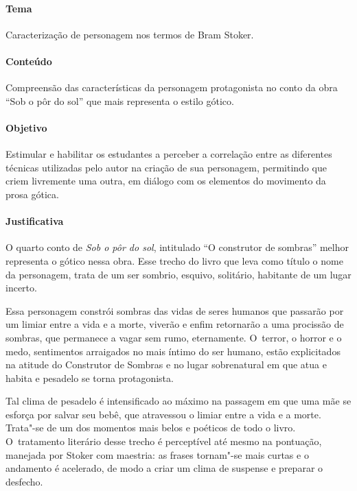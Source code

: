 \documentclass[12pt]{extarticle}
\begin{document}
\paragraph{Tema} Caracterização de personagem nos termos de Bram Stoker.

\paragraph{Conteúdo} Compreensão das características da personagem protagonista 
no conto da obra ``Sob o pôr do sol'' que mais representa o estilo gótico.  

\paragraph{Objetivo} Estimular e habilitar os estudantes a perceber a 
correlação entre as diferentes técnicas utilizadas pelo autor na criação de sua 
personagem, permitindo que criem livremente uma outra, em diálogo com os elementos 
do movimento da prosa gótica. 

\paragraph{Justificativa} O quarto conto de \textit{Sob o pôr do sol}, intitulado 
``O construtor de sombras'' melhor representa o gótico nessa obra. Esse trecho do livro 
que leva como título o nome da personagem, trata de um ser sombrio, esquivo, solitário, 
habitante de um lugar incerto. 

Essa personagem constrói sombras das vidas de seres humanos que passarão por um limiar entre 
a vida e  a morte, viverão e enfim retornarão a uma procissão de sombras, que permanece a 
vagar sem rumo, eternamente. O~terror, o horror e o medo, sentimentos arraigados
no mais íntimo do ser humano, estão explicitados na atitude do
Construtor de Sombras e no lugar sobrenatural em que atua e habita e pesadelo se
torna protagonista. 

Tal clima de pesadelo é intensificado ao máximo na
passagem em que uma mãe se esforça por salvar seu bebê, que atravessou o
limiar entre a vida e a morte. Trata"-se de um dos momentos mais belos e poéticos de todo 
o livro. O~tratamento literário desse trecho é perceptível até mesmo na pontuação, manejada
por Stoker com maestria: as frases tornam"-se mais curtas e o andamento é
acelerado, de modo a criar um clima de suspense e preparar o desfecho.
\end{document}
